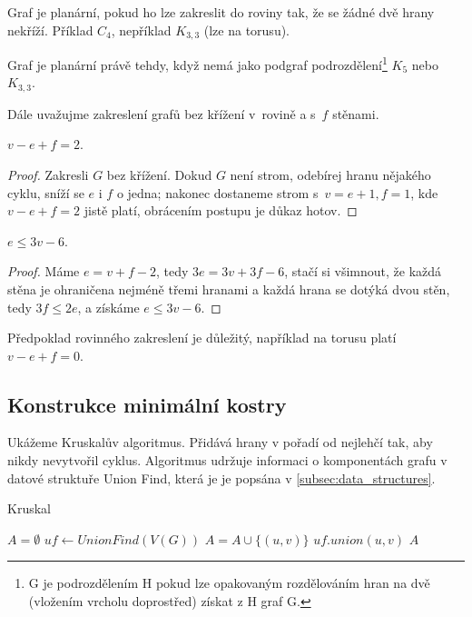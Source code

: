 Graf je planární, pokud ho lze zakreslit do roviny tak, že se žádné dvě
hrany nekříží. Příklad $C_4$, nepříklad $K_{3,3}$ (lze na torusu).

\begin{theorem}[Kuratowski]
Graf je planární právě tehdy, když nemá jako podgraf
podrozdělení\footnote{G je podrozdělením H pokud lze opakovaným
rozdělováním hran na dvě (vložením vrcholu doprostřed) získat z H graf
G.} $K_5$ nebo $K_{3,3}$.
\end{theorem}

Dále uvažujme zakreslení grafů bez křížení v~rovině a s~$f$
stěnami.

\begin{theorem}[Euler]
$v - e + f = 2$.
\end{theorem}

\begin{proof}
Zakresli $G$ bez křížení.  Dokud
$G$ není strom, odebírej hranu nějakého cyklu, sníží se $e$ i $f$ o
jedna; nakonec dostaneme strom s~$v = e + 1, f = 1$, kde $v - e + f = 2$
jistě platí, obrácením postupu je důkaz hotov.
\end{proof}

\begin{corollary}
$e \leq 3v - 6$.
\end{corollary}

\begin{proof}
Máme $e = v + f - 2$, tedy $3e = 3v + 3f -
6$, stačí si všimnout, že každá stěna je ohraničena nejméně třemi
hranami a každá hrana se dotýká dvou stěn, tedy $3f \leq 2e$,
a získáme $e \leq 3v - 6$.
\end{proof}

\begin{note}
    Předpoklad rovinného zakreslení je důležitý,
    například na torusu platí $v - e + f = 0$.
\end{note}

\subsection{Konstrukce minimální kostry}

Ukážeme Kruskalův algoritmus. Přidává hrany v pořadí od nejlehčí tak,
aby nikdy nevytvořil cyklus.
Algoritmus udržuje informaci o komponentách grafu v datové struktuře
Union Find, která je je popsána v
\autoref{subsec:data_structures}.

\begin{algorithm}
\caption{Kruskal}
\begin{algorithmic}[1]
    \State $A = \emptyset$
    \State $uf \gets UnionFind(V(G))$
            \State $A = A \cup \{(u,v)\}$
            \State $uf.union(u, v)$
        \EndIf
    \EndFor
    \State \Return $A$
\EndFunction
\end{algorithmic}
\end{algorithm}

